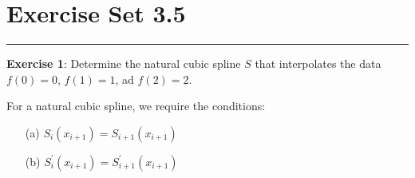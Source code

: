 \documentclass{article}
\begin{document}
\newpage
\section*{Exercise Set 3.5}
\hrule

\textbf{Exercise 1}: Determine the natural cubic spline $S$ that interpolates the data $f(0) = 0$, $f(1) = 1$, ad $f(2) = 2$.
    \begin{answer}
        For a natural cubic spline, we require the conditions:
            \begin{itemize}
                \item [(a)] $S_{i}(x_{i + 1}) = S_{i + 1}(x_{i + 1})$

                \item [(b)] $S^{\prime}_{i}(x_{i + 1}) = S^{\prime}_{i + 1}(x_{i + 1})$


\end{itemize}
\end{answer}
\end{document}
